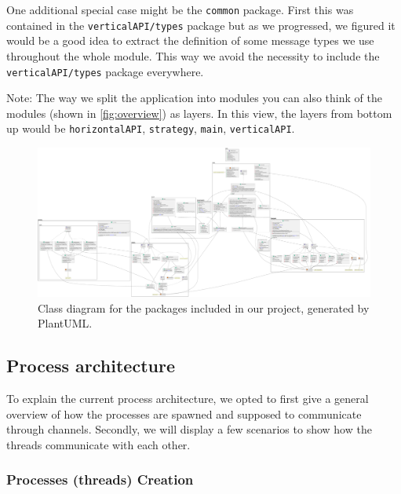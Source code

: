 \documentclass[a4paper,english,10pt,NET]{tumarticle}
\begin{document}
One additional special case might be the \texttt{common} package.
First this was contained in the \texttt{verticalAPI/types} package but as we progressed, we figured it would be a good idea to extract the definition of some message types we use throughout the whole module.
This way we avoid the necessity to include the \texttt{verticalAPI/types} package everywhere.

Note: The way we split the application into modules you can also think of the modules (shown in \cref{fig:overview}) as layers.
In this view, the layers from bottom up would be \texttt{horizontalAPI}, \texttt{strategy}, \texttt{main}, \texttt{verticalAPI}.

\begin{landscape}
	\pagestyle{empty}
	\begin{figure}
		\centering
		\hspace*{-0.1\linewidth}\includegraphics[width=1.2\linewidth]{figures/class}
		\caption{Class diagram for the packages included in our project, generated by PlantUML.}
		\label{fig:classDia}
	\end{figure}
\end{landscape}

\subsection{Process architecture}

To explain the current process architecture, we opted to first give a general overview of how the processes are spawned and supposed to communicate through channels. Secondly, we will display a few scenarios to show how the threads communicate with each other.

\subsubsection{Processes (threads) Creation} \label{process-creation}
\end{document}
